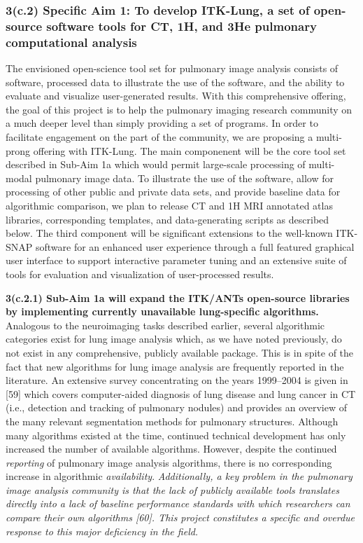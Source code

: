 \documentclass[11pt,]{article}
\begin{document}
\subsubsection{\texorpdfstring{3(c.2) \textbf{Specific Aim 1:} To
develop ITK-Lung, a set of open-source software tools for CT, 1H, and
3He pulmonary computational
analysis}{3(c.2) Specific Aim 1: To develop ITK-Lung, a set of open-source software tools for CT, 1H, and 3He pulmonary computational analysis}}\label{c.2-specific-aim-1-to-develop-itk-lung-a-set-of-open-source-software-tools-for-ct-1h-and-3he-pulmonary-computational-analysis}

The envisioned open-science tool set for pulmonary image analysis
consists of software, processed data to illustrate the use of the
software, and the ability to evaluate and visualize user-generated
results. With this comprehensive offering, the goal of this project is
to help the pulmonary imaging research community on a much deeper level
than simply providing a set of programs. In order to facilitate
engagement on the part of the community, we are proposing a multi-prong
offering with ITK-Lung. The main componenent will be the core tool set
described in Sub-Aim 1a which would permit large-scale processing of
multi-modal pulmonary image data. To illustrate the use of the software,
allow for processing of other public and private data sets, and provide
baseline data for algorithmic comparison, we plan to release CT and 1H
MRI annotated atlas libraries, corresponding templates, and
data-generating scripts as described below. The third component will be
significant extensions to the well-known ITK-SNAP software for an
enhanced user experience through a full featured graphical user
interface to support interactive parameter tuning and an extensive suite
of tools for evaluation and visualization of user-processed results.

\textbf{3(c.2.1) Sub-Aim 1a will expand the ITK/ANTs open-source
libraries by implementing currently unavailable lung-specific
algorithms.} Analogous to the neuroimaging tasks described earlier,
several algorithmic categories exist for lung image analysis which, as
we have noted previously, do not exist in any comprehensive, publicly
available package. This is in spite of the fact that new algorithms for
lung image analysis are frequently reported in the literature. An
extensive survey concentrating on the years 1999--2004 is given in
{[}59{]} which covers computer-aided diagnosis of lung disease and lung
cancer in CT (i.e., detection and tracking of pulmonary nodules) and
provides an overview of the many relevant segmentation methods for
pulmonary structures. Although many algorithms existed at the time,
continued technical development has only increased the number of
available algorithms. However, despite the continued \emph{reporting} of
pulmonary image analysis algorithms, there is no corresponding increase
in algorithmic \emph{availability}. \emph{Additionally, a key problem in
the pulmonary image analysis community is that the lack of publicly
available tools translates directly into a lack of baseline performance
standards with which researchers can compare their own algorithms
{[}60{]}. This project constitutes a specific and overdue response to
this major deficiency in the field.}
\end{document}
